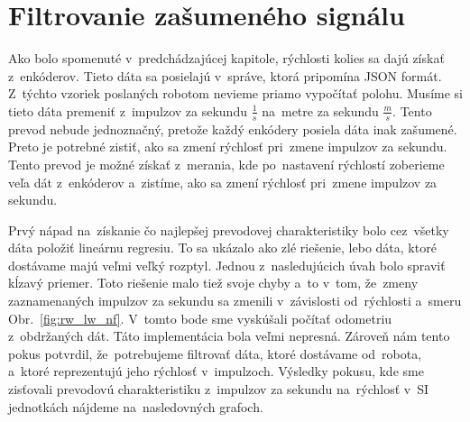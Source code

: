 




\section{Filtrovanie zašumeného signálu}
\label{sec:ziskavanieRychlosti}

Ako bolo spomenuté v~predchádzajúcej kapitole, rýchlosti kolies sa dajú získať z~enkóderov. Tieto dáta sa posielajú v~správe, ktorá pripomína JSON formát.
Z~týchto vzoriek poslaných robotom nevieme priamo vypočítať polohu. Musíme si tieto dáta premeniť z~impulzov za sekundu \(\frac{1}{s}\) na~metre
za sekundu \(\frac{m}{s}\). Tento prevod nebude jednoznačný, pretože každý enkódery posiela dáta inak zašumené. Preto je potrebné zistiť, ako sa zmení
rýchlosť pri~zmene impulzov za sekundu. Tento prevod je možné získať z~merania, kde po~nastavení rýchlostí zoberieme veľa dát z~enkóderov a~zistíme,
ako sa zmení rýchlosť pri~zmene impulzov za sekundu.

Prvý nápad na~získanie čo najlepšej prevodovej charakteristiky bolo cez~všetky dáta položiť lineárnu regresiu. To sa ukázalo ako zlé riešenie, lebo dáta,
ktoré dostávame majú veľmi veľký rozptyl. Jednou z~nasledujúcich úvah bolo spraviť kĺzavý priemer. Toto riešenie malo tiež svoje chyby a~to v~tom, že~zmeny
zaznamenaných impulzov za sekundu sa zmenili v~závislosti od~rýchlosti a~smeru Obr.~\ref{fig:rw_lw_nf}. V~tomto bode sme vyskúšali počítať odometriu
z~obdržaných dát. Táto implementácia bola veľmi nepresná. Zároveň nám tento pokus potvrdil, že~potrebujeme filtrovať dáta, ktoré dostávame
od~robota, a~ktoré reprezentujú jeho rýchlosť v~impulzoch. Výsledky pokusu, kde sme zisťovali prevodovú charakteristiku z~impulzov za sekundu na~rýchlosť
v~SI jednotkách nájdeme na~nasledovných grafoch.

